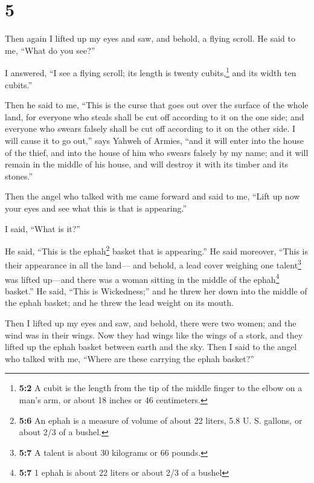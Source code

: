 \hypertarget{section-4}{%
\section{5}\label{section-4}}

 Then again I lifted up my eyes and saw, and behold, a
flying scroll.  He said to me, ``What do you see?''

I answered, ``I see a flying scroll; its length is twenty
cubits,\footnote{\textbf{5:2} A cubit is the length from the tip of the
  middle finger to the elbow on a man's arm, or about 18 inches or 46
  centimeters.} and its width ten cubits.''

 Then he said to me, ``This is the curse that goes out
over the surface of the whole land, for everyone who steals shall be cut
off according to it on the one side; and everyone who swears falsely
shall be cut off according to it on the other side.  I
will cause it to go out,'' says Yahweh of Armies, ``and it will enter
into the house of the thief, and into the house of him who swears
falsely by my name; and it will remain in the middle of his house, and
will destroy it with its timber and its stones.''

 Then the angel who talked with me came forward and said
to me, ``Lift up now your eyes and see what this is that is appearing.''

 I said, ``What is it?''

He said, ``This is the ephah\footnote{\textbf{5:6} An ephah is a measure
  of volume of about 22 liters, 5.8 U. S. gallons, or about 2/3 of a
  bushel.} basket that is appearing.'' He said moreover, ``This is their
appearance in all the land---  and behold, a lead cover
weighing one talent\footnote{\textbf{5:7} A talent is about 30 kilograms
  or 66 pounds.} was lifted up---and there was a woman sitting in the
middle of the ephah\footnote{\textbf{5:7} 1 ephah is about 22 liters or
  about 2/3 of a bushel} basket.''  He said, ``This is
Wickedness;'' and he threw her down into the middle of the ephah basket;
and he threw the lead weight on its mouth.

 Then I lifted up my eyes and saw, and behold, there were
two women; and the wind was in their wings. Now they had wings like the
wings of a stork, and they lifted up the ephah basket between earth and
the sky.  Then I said to the angel who talked with me,
``Where are these carrying the ephah basket?''

